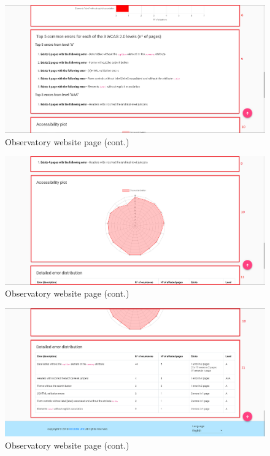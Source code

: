 \begin{figure}[H]
    \centering
    \includegraphics[width=\linewidth]{lib/images/observatory/observatory_website_page_2.png}
    \caption{Observatory website page (cont.)}
    \label{fig:obs_website_page_2}
\end{figure}

\begin{figure}[H]
    \centering
    \includegraphics[width=\linewidth]{lib/images/observatory/observatory_website_page_3.png}
    \caption{Observatory website page (cont.)}
    \label{fig:obs_website_page_3}
\end{figure}

\begin{figure}[H]
    \centering
    \includegraphics[width=\linewidth]{lib/images/observatory/observatory_website_page_4.png}
    \caption{Observatory website page (cont.)}
    \label{fig:obs_website_page_4}
\end{figure}

